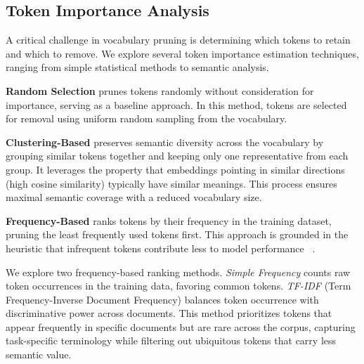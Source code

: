 \documentclass[twocolumn]{article}
\begin{document}

\subsection{Token Importance Analysis}
A critical challenge in vocabulary pruning is determining which tokens to retain and which to remove.
We explore several token importance estimation techniques, ranging from simple statistical methods to semantic analysis.

\textbf{Random Selection}
prunes tokens randomly without consideration for importance, serving as a baseline approach. In this method, tokens are selected for removal using uniform random sampling from the vocabulary.

\textbf{Clustering-Based}
preserves semantic diversity across the vocabulary by grouping similar tokens together and keeping only one representative from each group. It leverages the property that embeddings pointing in similar directions (high cosine similarity) typically have similar meanings\cite{mikolov2013efficient}. 
This process ensures maximal semantic coverage with a reduced vocabulary size.

\textbf{Frequency-Based} ranks tokens by their frequency in the training dataset, pruning the least frequently used tokens first. This approach is grounded in the heuristic that infrequent tokens contribute less to model performance ~\cite {li2024enhancing}.

We explore two frequency-based ranking methods. 
\textit{Simple Frequency} counts raw token occurrences in the training data, favoring common tokens.
\textit{TF-IDF} (Term Frequency-Inverse Document Frequency) balances token occurrence with discriminative power across documents. This method prioritizes tokens that appear frequently in specific documents but are rare across the corpus, capturing task-specific terminology while filtering out ubiquitous tokens that carry less semantic value. 

\end{document}
